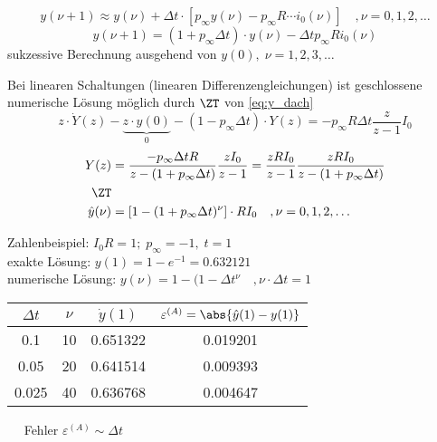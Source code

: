\begin{equation}
y(\nu+1)\approx y(\nu) + \Delta t\cdot\left[p_\infty y(\nu) - p_\infty R\cdots i_0(\nu)\right]\quad ,\nu = 0,1,2,\ldots
\end{equation}
\begin{equation}
\hat{y}(\nu+1) = (1+p_\infty\Delta t)\cdot y(\nu) - \Delta t p_\infty R i_0(\nu)
\label{eq:y_dach}
\end{equation}
sukzessive Berechnung ausgehend von $y(0),\;\nu = 1,2,3,\ldots$

Bei linearen Schaltungen (linearen Differenzengleichungen) ist geschlossene numerische Lösung möglich durch $\ZT$ von \autoref{eq:y_dach}
\begin{equation}
z\cdot\dot{Y}(z)-\underbrace{z\cdot y(0)}_{0} - (1-p_\infty\Delta t)\cdot Y(z) = -p_\infty R\Delta t \frac{z}{z-1}I_0
\end{equation}
\begin{equation}
\begin{split}
Y(z) &= \frac{-p_\infty\Delta t R}{z-(1+p_\infty\Delta t)}\frac{zI_0}{z-1} = \frac{zRI_0}{z-1}\frac{zRI_0}{z-(1+p_\infty\Delta t)}\\
\ZT\\
\hat{y}(\nu) &= \left[1-(1+p_\infty\Delta t)^\nu\right]\cdot RI_0\quad ,\nu = 0,1,2,\ldots
\end{split}
\end{equation}

Zahlenbeispiel: $I_0R = 1;\;p_\infty = -1,\; t=1$\\
exakte Lösung: $y(1) = 1-e^{-1} = \num{0.632121}$\\
numerische Lösung: $y(\nu) = 1-(1-\Delta t^\nu\quad ,\nu\cdot\Delta t = 1$

\begin{tabular}{c|c|c|c}
$\Delta t$ & $\nu$ & $\dot{y}(1)$ & $\varepsilon^{(A)} = \abs{\hat{y}(1)-y(1)}$\\
\hline
\num{0.1} & \num{10} & \num{0.651322} & \num{0.019201}\\
\num{0.05} & \num{20} & \num{0.641514} & \num{0.009393}\\
\num{0.025} & \num{40} & \num{0.636768} & \num{0.004647}\\
\end{tabular} 
$\quad$ Fehler $\varepsilon^{(A)}\sim \Delta t$